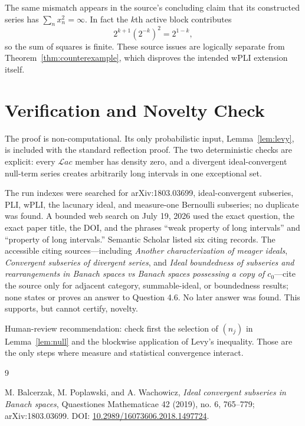 \documentclass[11pt]{article}
\newcommand{\Lac}{\mathcal{L}ac}
\begin{document}
The same mismatch appears in the source's concluding claim that its constructed
series has $\sum_nx_n^2=\infty$.  In fact the $k$th active block contributes
\[
 2^{k+1}(2^{-k})^2=2^{1-k},
\]
so the sum of squares is finite.  These source issues are logically separate
from Theorem~\ref{thm:counterexample}, which disproves the intended wPLI
extension itself.

\section*{Verification and Novelty Check}

The proof is non-computational.  Its only probabilistic input,
Lemma~\ref{lem:levy}, is included with the standard reflection proof.  The
two deterministic checks are explicit: every $\Lac$ member has density zero,
and a divergent ideal-convergent null-term series creates arbitrarily long
intervals in one exceptional set.

The run indexes were searched for arXiv:1803.03699, ideal-convergent
subseries, PLI, wPLI, the lacunary ideal, and measure-one Bernoulli subseries;
no duplicate was found.  A bounded web search on July 19, 2026 used the exact
question, the exact paper title, the DOI, and the phrases ``weak property of
long intervals'' and ``property of long intervals.''  Semantic Scholar listed
six citing records.  The accessible citing sources---including
\emph{Another characterization of meager ideals}, \emph{Convergent subseries
of divergent series}, and \emph{Ideal boundedness of subseries and
rearrangements in Banach spaces vs Banach spaces possessing a copy of
$c_0$}---cite the source only for adjacent category, summable-ideal, or
boundedness results; none states or proves an answer to Question 4.6.  No
later answer was found.  This supports, but cannot certify, novelty.

Human-review recommendation: check first the selection of $(n_j)$ in
Lemma~\ref{lem:null} and the blockwise application of Levy's inequality.
Those are the only steps where measure and statistical convergence interact.

\begin{thebibliography}{9}

M. Balcerzak, M. Poplawski, and A. Wachowicz,
\emph{Ideal convergent subseries in Banach spaces},
Quaestiones Mathematicae 42 (2019), no. 6, 765--779;
arXiv:1803.03699.\newline
DOI: \href{https://doi.org/10.2989/16073606.2018.1497724}
{10.2989/16073606.2018.1497724}.

\end{thebibliography}
\end{document}
